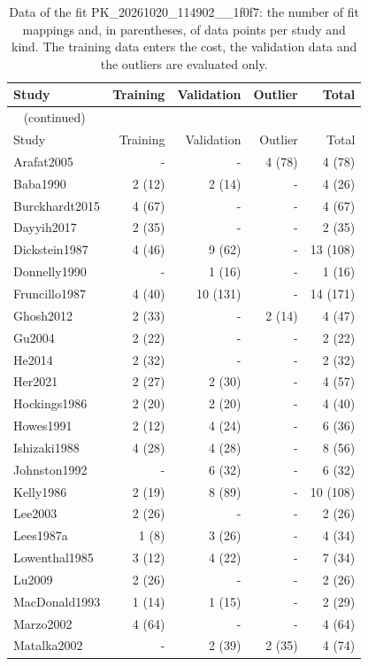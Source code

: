 \begin{longtable}{lrrrr}
\caption{Data of the fit PK\_20261020\_114902\_\_1f0f7: the number of fit mappings and, in parentheses, of data points per study and kind. The training data enters the cost, the validation data and the outliers are evaluated only.}\label{tab:data:PK_20261020_114902__1f0f7} \\
\toprule
Study & Training & Validation & Outlier & Total \\
\midrule
\endfirsthead
\multicolumn{5}{l}{\small\tablename~\thetable{} (continued)} \\
\toprule
Study & Training & Validation & Outlier & Total \\
\midrule
\endhead
\bottomrule
\endlastfoot
Arafat2005 & - & - & 4 (78) & 4 (78) \\
Baba1990 & 2 (12) & 2 (14) & - & 4 (26) \\
Burckhardt2015 & 4 (67) & - & - & 4 (67) \\
Dayyih2017 & 2 (35) & - & - & 2 (35) \\
Dickstein1987 & 4 (46) & 9 (62) & - & 13 (108) \\
Donnelly1990 & - & 1 (16) & - & 1 (16) \\
Fruncillo1987 & 4 (40) & 10 (131) & - & 14 (171) \\
Ghosh2012 & 2 (33) & - & 2 (14) & 4 (47) \\
Gu2004 & 2 (22) & - & - & 2 (22) \\
He2014 & 2 (32) & - & - & 2 (32) \\
Her2021 & 2 (27) & 2 (30) & - & 4 (57) \\
Hockings1986 & 2 (20) & 2 (20) & - & 4 (40) \\
Howes1991 & 2 (12) & 4 (24) & - & 6 (36) \\
Ishizaki1988 & 4 (28) & 4 (28) & - & 8 (56) \\
Johnston1992 & - & 6 (32) & - & 6 (32) \\
Kelly1986 & 2 (19) & 8 (89) & - & 10 (108) \\
Lee2003 & 2 (26) & - & - & 2 (26) \\
Lees1987a & 1 (8) & 3 (26) & - & 4 (34) \\
Lowenthal1985 & 3 (12) & 4 (22) & - & 7 (34) \\
Lu2009 & 2 (26) & - & - & 2 (26) \\
MacDonald1993 & 1 (14) & 1 (15) & - & 2 (29) \\
Marzo2002 & 4 (64) & - & - & 4 (64) \\
Matalka2002 & - & 2 (39) & 2 (35) & 4 (74) \\

\end{longtable}
